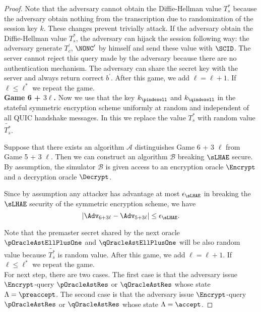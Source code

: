 \begin{proof}
 Note that the adversary cannot obtain the Diffie-Hellman value $T_s^{\ast}$ because the adversary obtain nothing from the transcription due to randomization of the session key $k$. These changes prevent trivially attack. If the adversary obtain the Diffie-Hellman value $T_s^{\ast}$, the adversary can hijack the session following way: the adversary generate $T_c^{\prime}$, $\NONC^{\prime}$ by himself and send these value with $\SCID$. The server cannot reject this query made by the adversary because there are no authentication mechanism. The adversary can share the secret key with the server and always return correct $b^{\prime}$.
 After this game, we add $\ell = \ell + 1$. If $\ell \leq \ell^{\ast}$ we repeat the game.
\vspace{10pt}\\%
%
%
 \textbf{Game 6 + $3\ell$.} Now we use that the key $k_{\pindexell}$ and $k_{\qindexell}$ in the stateful symmetric encryption scheme uniformly at random and independent of all QUIC handshake messages. In this we replace the value $T_s^{\ast}$ with random value $\widetilde{T_s^{\ast}}$.

 Suppose that there exists an algorithm $\mathcal{A}$ distinguishes Game 6 + 3 $\ell$ from Game 5 + 3 $\ell$. Then we can construct an algorithm $\mathcal{B}$ breaking $\sLHAE$ secure. By assumption, the simulator $\mathcal{B}$ is given access to an encryption oracle $\Encrypt$ and a decryption oracle $\Decrypt$.

 Since by assumption any attacker has advantage at most $\epsilon_{\sLHAE}$ in breaking the $\sLHAE$ security of the symmetric encryption scheme, we have
 \begin{equation}
  |\Adv_{6 + 3\ell} - \Adv_{5 + 3\ell}| \leq \epsilon_{\sLHAE}.
 \end{equation}%

 Note that the premaster secret shared by the next oracle $\pOracleAstEllPlusOne$ and $\qOracleAstEllPlusOne$ will be also random value because $\widetilde{T_s^{\ast}}$ is random value.
 After this game, we add $\ell = \ell + 1$. If $\ell \leq \ell^{\ast}$ we repeat the game.
\vspace{10pt}\\%
%
%
 For next step, there are two cases. The first case is that the adversary issue $\Encrypt$-query $\pOracleAstRes$ or $\qOracleAstRes$ whose state $\Lambda = \preaccept$. The second case is that the adversary issue $\Encrypt$-query $\pOracleAstRes$ or $\qOracleAstRes$ whose state $\Lambda = \accept$.


\end{proof}
